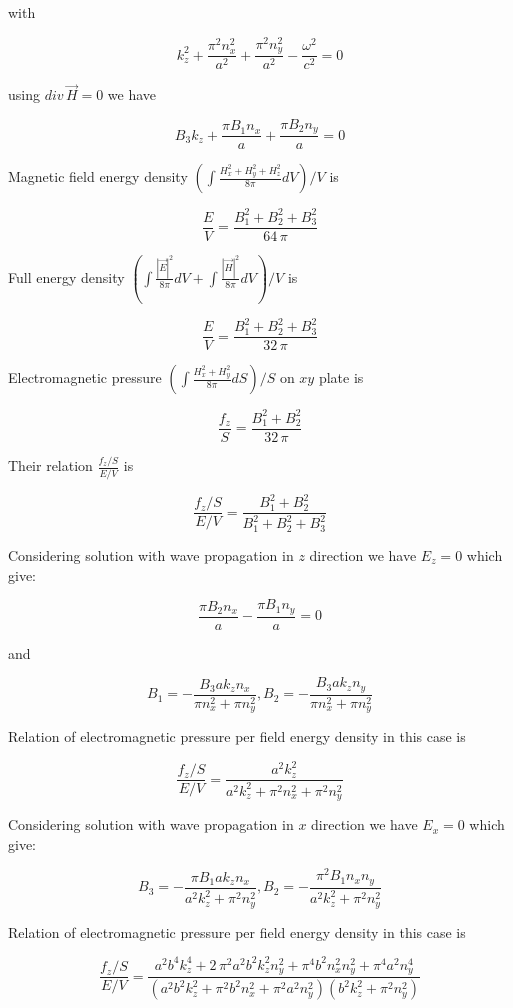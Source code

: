 \documentclass[twoside, 10pt]{article}
\begin{document}
\begin{multicols}{2}
    with

\[k_{z}^{2} + \frac{\pi^{2} n_{x}^{2}}{a^{2}} + \frac{\pi^{2} n_{y}^{2}}{a^{2}} - \frac{\omega^{2}}{c^{2}} = 0\]

    using \(div\,\vec{H} = 0\) we have

\[B_{3} k_{z} + \frac{\pi B_{1} n_{x}}{a} + \frac{\pi B_{2} n_{y}}{a} = 0\]

    Magnetic field energy density
\(\left(\int \frac{H_x^2+H_y^2+H_z^2}{8 \pi}dV\right)\big/{V}\) is

\[\frac{E}{V} = \frac{{B_{1}^{2} + B_{2}^{2} + B_{3}^{2}}}{64 \, \pi}\]

    Full energy density
\(\left(\int \frac{|\vec{E}|^2}{8 \pi}dV + \int \frac{|\vec{H}|^2}{8 \pi}dV\right)\big/{V}\)
is

    \[\frac{E}{V} = \frac{{B_{1}^{2} + B_{2}^{2} + B_{3}^{2}}}{32 \, \pi}\]

    Electromagnetic pressure
\(\left({\int \frac {H_x^2+H_y^2}{8 \pi} dS}\right)\big/{S}\) on \(xy\)
plate is

\[\frac{f_z}{S}=\frac{{B_{1}^{2} + B_{2}^{2}}}{32 \, \pi}\]

Their relation \(\frac{f_z/S}{E/V}\) is

\[\frac{f_z/S}{E/V} = \frac{{B_{1}^{2} + B_{2}^{2}}}{B_{1}^{2} + B_{2}^{2} + B_{3}^{2}}\]

Considering solution with wave propagation in \(z\) direction we have
\(E_z = 0\) which give:

\[\frac{\pi B_{2} n_{x}}{a} - \frac{\pi B_{1} n_{y}}{a} = 0\]

and

\[B_1 = -\frac{B_{3} a k_{z} n_{x}}{\pi n_{x}^{2} + \pi n_{y}^{2}},
B_2 = -\frac{B_{3} a k_{z} n_{y}}{\pi n_{x}^{2} + \pi n_{y}^{2}}\]

Relation of electromagnetic pressure per field energy density in this
case is

\[\frac{f_z/S}{E/V} = \frac{a^{2} k_{z}^{2}}{a^{2} k_{z}^{2} + \pi^{2} n_{x}^{2} + \pi^{2} n_{y}^{2}}\]

    Considering solution with wave propagation in \(x\) direction we have
\(E_x = 0\) which give:

\[B_3 = -\frac{\pi B_{1} a k_{z} n_{x}}{a^{2} k_{z}^{2} + \pi^{2} n_{y}^{2}}, 
B_2 = -\frac{\pi^{2} B_{1} n_{x} n_{y}}{a^{2} k_{z}^{2} + \pi^{2} n_{y}^{2}}\]

Relation of electromagnetic pressure per field energy density in this
case is

\[\frac{f_z/S}{E/V} = \frac{a^{2} b^{4} k_{z}^{4} + 2 \, \pi^{2} a^{2} b^{2} k_{z}^{2} n_{y}^{2} + \pi^{4} b^{2} n_{x}^{2} n_{y}^{2} + \pi^{4} a^{2} n_{y}^{4}}{{\left(a^{2} b^{2} k_{z}^{2} + \pi^{2} b^{2} n_{x}^{2} + \pi^{2} a^{2} n_{y}^{2}\right)} {\left(b^{2} k_{z}^{2} + \pi^{2} n_{y}^{2}\right)}}\]


\end{multicols}
\end{document}
